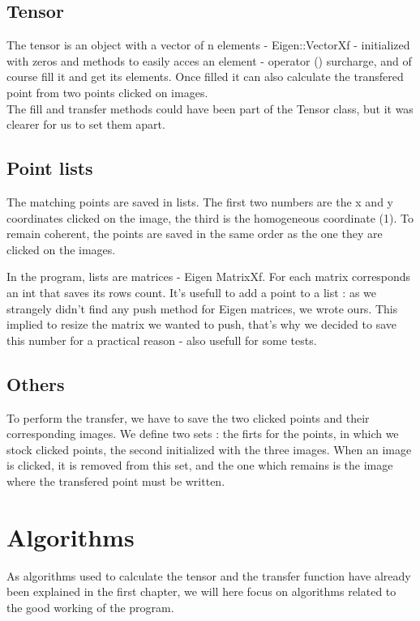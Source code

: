 \documentclass[a4paper,10pt]{report}
\begin{document}
\subsection{Tensor}

The tensor is an object with a vector of n elements - Eigen::VectorXf - initialized with zeros
and methods to easily acces an element - operator () surcharge, and of course fill it and get its elements.
Once filled it can also calculate the transfered point from two points clicked on images.
\\

The fill and transfer methods could have been part of the Tensor class, but it was clearer
for us to set them apart.
\\

\subsection{Point lists}

The matching points are saved in lists. The first two numbers are the x and y coordinates
clicked on the image, the third is the homogeneous coordinate (1). To remain coherent,
the points are saved in the same order as the one they are clicked on the images.

In the program, lists are matrices - Eigen MatrixXf. For each matrix corresponds an int that 
saves its rows count. It's usefull to add a point to a list : as we strangely didn't find
any push method for Eigen matrices, we wrote ours. This implied to resize the matrix we wanted
to push, that's why we decided to save this number for a practical reason - also usefull for some tests.
\\

\subsection{Others}

To perform the transfer, we have to save the two clicked points and their corresponding images.
We define two sets : the firts for the points, in which we stock clicked points, the second initialized with
the three images. When an image is clicked, it is removed from this set, and the one which remains
is the image where the transfered point must be written.
\\

\section{Algorithms}
As algorithms used to calculate the tensor and the transfer function have already been explained
in the first chapter, we will here focus on algorithms related to the good working of the program.
\\
\end{document}
